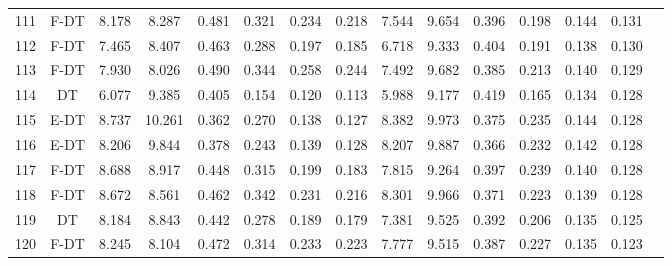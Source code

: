 \begin{longtable}{@{\hskip3pt}c@{\hskip3pt}c@{\hskip3pt}c@{\hskip3pt}c@{\hskip3pt}c@{\hskip3pt}c@{\hskip3pt}c@{\hskip3pt}c@{\hskip3pt}c@{\hskip3pt}c@{\hskip3pt}c@{\hskip3pt}c@{\hskip3pt}c@{\hskip3pt}c@{\hskip3pt}c}
        111 &           F-DT &             8.178 &       8.287 &         0.481 &       0.321 &       0.234 &        0.218 &               7.544 &       9.654 &         0.396 &       0.198 &       0.144 &        0.131 \\
        112 &           F-DT &             7.465 &       8.407 &         0.463 &       0.288 &       0.197 &        0.185 &               6.718 &       9.333 &         0.404 &       0.191 &       0.138 &        0.130 \\
        113 &           F-DT &             7.930 &       8.026 &         0.490 &       0.344 &       0.258 &        0.244 &               7.492 &       9.682 &         0.385 &       0.213 &       0.140 &        0.129 \\
        114 &             DT &             6.077 &       9.385 &         0.405 &       0.154 &       0.120 &        0.113 &               5.988 &       9.177 &         0.419 &       0.165 &       0.134 &        0.128 \\
        115 &           E-DT &             8.737 &      10.261 &         0.362 &       0.270 &       0.138 &        0.127 &               8.382 &       9.973 &         0.375 &       0.235 &       0.144 &        0.128 \\
        116 &           E-DT &             8.206 &       9.844 &         0.378 &       0.243 &       0.139 &        0.128 &               8.207 &       9.887 &         0.366 &       0.232 &       0.142 &        0.128 \\
        117 &           F-DT &             8.688 &       8.917 &         0.448 &       0.315 &       0.199 &        0.183 &               7.815 &       9.264 &         0.397 &       0.239 &       0.140 &        0.128 \\
        118 &           F-DT &             8.672 &       8.561 &         0.462 &       0.342 &       0.231 &        0.216 &               8.301 &       9.966 &         0.371 &       0.223 &       0.139 &        0.128 \\
        119 &             DT &             8.184 &       8.843 &         0.442 &       0.278 &       0.189 &        0.179 &               7.381 &       9.525 &         0.392 &       0.206 &       0.135 &        0.125 \\
        120 &           F-DT &             8.245 &       8.104 &         0.472 &       0.314 &       0.233 &        0.223 &               7.777 &       9.515 &         0.387 &       0.227 &       0.135 &        0.123 \\

\end{longtable}
